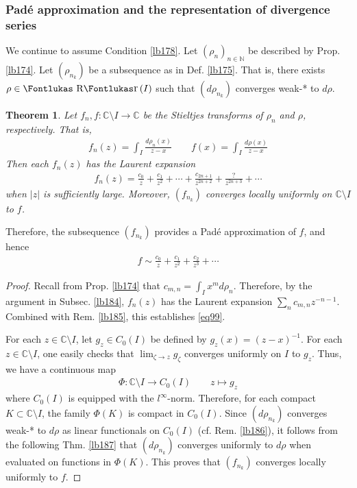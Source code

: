 \documentclass[12pt,b5paper,notitlepage]{article}
\theoremstyle{definition}
\theoremstyle{plain}
\newtheorem{thm}[df]{Theorem}
\DeclareMathOperator{\Rr}{\text{\Fontlukas R}\text{\kern -0pt {\Fontlukas\large r}}\,}
\newcommand{\Cbb}{\mathbb C}
\newcommand{\Nbb}{\mathbb N}
\numberwithin{equation}{section}
\begin{document}
\subsubsection{Pad\'e approximation and the representation of divergence series}


We continue to assume Condition \ref{lb178}. Let $(\rho_n)_{n\in\Nbb}$ be described by Prop. \ref{lb174}. Let $(\rho_{n_k})$ be a subsequence as in Def. \ref{lb175}. That is, there exists $\rho\in\Rr(I)$ such that $(d\rho_{n_k})$ converges weak-* to $d\rho$.


\begin{thm}\label{lb183}
Let $f_n,f:\Cbb\setminus I\rightarrow\Cbb$ be the Stieltjes transforms of $\rho_n$ and $\rho$, respectively. That is,
\begin{gather*}
f_n(z)=\int_I\frac{d\rho_n(x)}{z-x}\qquad f(x)=\int_I\frac{d\rho(x)}{z-x}
\end{gather*}
Then each $f_n(z)$ has the Laurent expansion
\begin{align}\label{eq99}
f_n(z)=\frac{c_0}{z}+\frac{c_1}{z^2}+\cdots+\frac{c_{2n+1}}{z^{2n+2}}+\frac{?}{z^{2n+3}}+\cdots
\end{align}
when $|z|$ is sufficiently large. Moreover, $(f_{n_k})$ converges locally uniformly on $\Cbb\setminus I$ to $f$.
\end{thm}


Therefore, the subsequence $(f_{n_k})$ provides a Pad\'e approximation of $f$, and hence
\begin{align*}
f\sim \frac{c_0}{z}+\frac{c_1}{z^2}+\frac{c_2}{z^3}+\cdots
\end{align*}



\begin{proof}
Recall from Prop. \ref{lb174} that $c_{m,n}=\int_I x^md\rho_n$. Therefore, by the argument in Subsec. \ref{lb184}, $f_n(z)$ has the Laurent expansion $\sum_n c_{m,n}z^{-n-1}$. Combined with Rem. \ref{lb185}, this establishes \eqref{eq99}.

For each $z\in \Cbb\setminus I$, let $g_z\in C_0(I)$ be defined by $g_z(x)=(z-x)^{-1}$. For each $z\in\Cbb\setminus I$, one easily checks that $\lim_{\zeta\rightarrow z}g_\zeta$ converges uniformly on $I$ to $g_z$. Thus, we have a continuous map
\begin{align*}
\Phi:\Cbb\setminus I\rightarrow C_0(I)\qquad z\mapsto g_z
\end{align*}
where $C_0(I)$ is equipped with the $l^\infty$-norm. Therefore, for each compact $K\subset\Cbb\setminus I$, the family $\Phi(K)$ is compact in $C_0(I)$. Since $(d\rho_{n_k})$  converges weak-* to $d\rho$ as linear functionals on $C_0(I)$ (cf. Rem. \ref{lb186}), it follows from the following Thm. \ref{lb187} that $(d\rho_{n_k})$ converges uniformly to $d\rho$ when evaluated on functions in $\Phi(K)$. This proves that $(f_{n_k})$ converges locally uniformly to $f$.
\end{proof}
\end{document}
